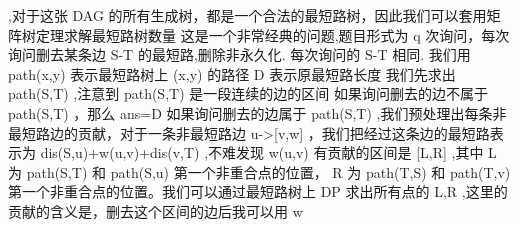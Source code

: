 {}\markdownRendererDollarSign{},对于这张\markdownRendererDollarSign{} DAG\markdownRendererSoftLineBreak
{}\markdownRendererDollarSign{}的所有生成树，都是一个合法的最短路树，因此我们可以套用矩阵树定理求解最短路树数量\markdownRendererInterblockSeparator
{}
\markdownRendererSectionEnd \markdownRendererSectionBegin
{}\markdownRendererInterblockSeparator
{}这是一个非常经典的问题,题目形式为\markdownRendererDollarSign{} q \markdownRendererDollarSign{}次询问，每次询问删去某条边\markdownRendererDollarSign{} S-T \markdownRendererDollarSign{}的最短路,删除非永久化.\markdownRendererParagraphSeparator
{}每次询问的\markdownRendererDollarSign{} S-T \markdownRendererDollarSign{}相同.\markdownRendererParagraphSeparator
{}我们用\markdownRendererDollarSign{} path(x,y) \markdownRendererDollarSign{}表示最短路树上\markdownRendererDollarSign{} (x,y) \markdownRendererDollarSign{}的路径 \markdownRendererDollarSign{} D\markdownRendererSoftLineBreak
{}\markdownRendererDollarSign{}表示原最短路长度\markdownRendererParagraphSeparator
{}我们先求出\markdownRendererDollarSign{} path(S,T) \markdownRendererDollarSign{},注意到\markdownRendererDollarSign{} path(S,T) \markdownRendererDollarSign{}是一段连续的边的区间\markdownRendererParagraphSeparator
{}如果询问删去的边不属于\markdownRendererDollarSign{} path(S,T) \markdownRendererDollarSign{}，那么\markdownRendererDollarSign{} ans=D \markdownRendererDollarSign{}\markdownRendererParagraphSeparator
{}如果询问删去的边属于\markdownRendererDollarSign{} path(S,T) \markdownRendererDollarSign{},我们预处理出每条非最短路边的贡献，对于一条非最短路边\markdownRendererDollarSign{} u->[v,w] \markdownRendererDollarSign{}，我们把经过这条边的最短路表示为\markdownRendererDollarSign{} dis(S,u)+w(u,v)+dis(v,T) \markdownRendererDollarSign{},不难发现\markdownRendererDollarSign{} w(u,v) \markdownRendererDollarSign{}有贡献的区间是\markdownRendererDollarSign{} [L,R] \markdownRendererDollarSign{},其中\markdownRendererDollarSign{} L\markdownRendererSoftLineBreak
{}\markdownRendererDollarSign{}为\markdownRendererDollarSign{} path(S,T) \markdownRendererDollarSign{}和\markdownRendererDollarSign{} path(S,u) \markdownRendererDollarSign{}第一个非重合点的位置，\markdownRendererDollarSign{} R\markdownRendererParagraphSeparator
{} \markdownRendererDollarSign{}为\markdownRendererDollarSign{} path(T,S) \markdownRendererDollarSign{}和\markdownRendererDollarSign{} path(T,v) \markdownRendererDollarSign{}第一个非重合点的位置。我们可以通过最短路树上\markdownRendererDollarSign{} DP \markdownRendererDollarSign{}求出所有点的\markdownRendererDollarSign{} L,R \markdownRendererDollarSign{},这里的贡献的含义是，删去这个区间的边后我可以用\markdownRendererDollarSign{} w\markdownRendererSoftLineBreak

